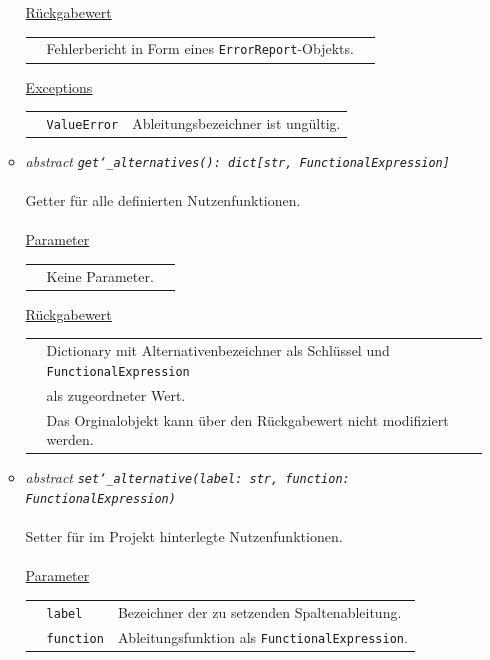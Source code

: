 \documentclass{article}
\begin{document}
\begin{itemize}
\begin{itemize}
\underline{Rückgabewert}\\
\begin{tabular}{lll}
 & Fehlerbericht in Form eines \texttt{ErrorReport}-Objekts.\\
\end{tabular}

\underline{Exceptions}\\
\begin{tabular}{lll}
 & \texttt{ValueError} & Ableitungsbezeichner ist ungültig.\\
\end{tabular}


\item \textit{\flqq{}abstract\frqq} \texttt{\textit{get\char`_alternatives(): dict[str, FunctionalExpression]}}\\\\
Getter für alle definierten Nutzenfunktionen.
\\\\
\underline{Parameter}\\
\begin{tabular}{lll}
 & Keine Parameter.\\
\end{tabular}

\underline{Rückgabewert}\\
\begin{tabular}{lll}
 & Dictionary mit Alternativenbezeichner als Schlüssel und \texttt{FunctionalExpression}\\
 & als zugeordneter Wert.\\
 & Das Orginalobjekt kann über den Rückgabewert nicht modifiziert werden.\\
\end{tabular}



\item \textit{\flqq{}abstract\frqq} \texttt{\textit{set\char`_alternative(label: str, function: FunctionalExpression)}}\\\\
Setter für im Projekt hinterlegte Nutzenfunktionen.
\\\\
\underline{Parameter}\\
\begin{tabular}{lll}
 & \texttt{label} & Bezeichner der zu setzenden Spaltenableitung.\\
 & \texttt{function} & Ableitungsfunktion als \texttt{FunctionalExpression}.\\
\end{tabular}


\end{itemize}
\end{itemize}
\end{document}
